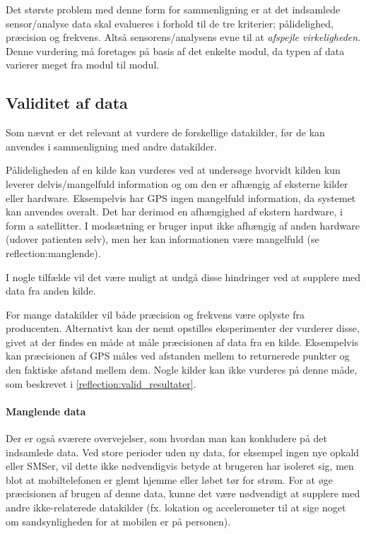 Det største problem med denne form for sammenligning er at det indsamlede sensor/analyse data skal evalueres i forhold til de tre kriterier; pålidelighed, præcision og frekvens.
Altså sensorens/analysens evne til at \textit{afspejle virkeligheden}.
Denne vurdering må foretages på basis af det enkelte modul, da typen af data varierer meget fra modul til modul.

\subsection{Validitet af data}
Som nævnt er det relevant at vurdere de forskellige datakilder, før de kan anvendes i sammenligning med andre datakilder.

Pålideligheden af en kilde kan vurderes ved at undersøge hvorvidt kilden kun leverer delvis/mangelfuld information og om den er afhængig af eksterne kilder eller hardware.
Eksempelvis har GPS ingen mangelfuld information, da systemet kan anvendes overalt.
Det har derimod en afhængighed af ekstern hardware, i form a satellitter.
I modsætning er bruger input ikke afhængig af anden hardware (udover patienten selv), men her kan informationen være mangelfuld (se reflection:manglende).

I nogle tilfælde vil det være muligt at undgå disse hindringer ved at supplere med data fra anden kilde.

For mange datakilder vil både præcision og frekvens være oplyste fra producenten.
Alternativt kan der nemt opstilles eksperimenter der vurderer disse, givet at der findes en måde at måle præcisionen af data fra en kilde.
Eksempelvis kan præcisionen af GPS måles ved afstanden mellem to returnerede punkter og den faktiske afstand mellem dem.
Nogle kilder kan ikke vurderes på denne måde, som beskrevet i \cref{reflection:valid_resultater}.

\paragraph{Manglende data}
Der er også sværere overvejelser, som hvordan man kan konkludere på det indsamlede data.
Ved store perioder uden ny data, for eksempel ingen nye opkald eller SMSer, vil dette ikke nødvendigvis betyde at brugeren har isoleret sig, men blot at mobiltelefonen er glemt hjemme eller løbet tør for strøm.
For at øge præcisionen af brugen af denne data, kunne det være nødvendigt at supplere med andre ikke-relaterede datakilder (fx. lokation og accelerometer til at sige noget om sandsynligheden for at mobilen er på personen).

